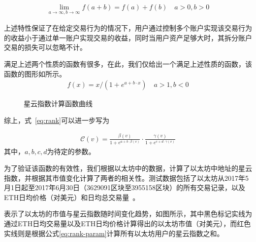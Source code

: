 \begin{align}
\lim\limits_{a \to \infty, b\to \infty} f(a+b) = f(a) + f(b)\quad a>0, b>0
\end{align}

\noindent 上述特性保证了在给定交易行为的情况下，用户通过控制多个账户实现该交易行为的收益小于通过单一账户实现交易的收益，同时当用户资产足够大时，其拆分账户交易的损失可以忽略不计。

\noindent 满足上述两个性质的函数有很多，在此，我们仅给出一个满足上述性质的函数，该函数的图形如所示。
\begin{align}
f(x) = x/(1 + e^{a + b\cdot x}) \quad a>1,b<0
\end{align}

\begin{figure}
\centering
{}
\caption{星云指数计算函数曲线 \label{fig-nr}}
\end{figure}


\vspace{2em}
综上，式~\ref{eq:rank}可以进一步写为

\begin{align}
\label{eq:rank-param}
\mathcal{C}(v) =  \frac{\beta(v)}{1+e^{a + b \cdot \beta(v)}} \cdot \frac{\gamma(v)}{1+e^{c + d \cdot \gamma(v)}}
\end{align}
\noindent 其中，$a, b, c, d$为待定的参数。

为了验证该函数的有效性，我们根据以太坊中的数据，计算了以太坊中地址的星云指数，并根据其市值变化计算了两者的相关性。测试数据包括了以太坊从2017年5月1日起至2017年6月30日（3629091区块至3955158区块）的所有交易记录，以及ETH日均价格（对美元）和日均总交易量~\cite{coinmarketcap}。


表示了以太坊的市值与星云指数随时间变化趋势，如图所示，其中黑色标记实线为通过ETH日均交易量以及ETH日均价格计算得出的以太坊市值（对美元），而红色实线则是根据公式\ref{eq:rank-param}计算所有以太坊用户的星云指数之和。

